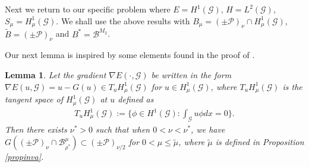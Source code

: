 \documentclass[10pt,a4paper]{article}
\newtheorem{lemma}[theorem]{Lemma}
\newtheorem{remark}[theorem]{Remark}
\theoremstyle{definition} \theoremstyle{remark}
\numberwithin{equation}{section}
\newcommand{\G}{\mathcal{G}}
\newcommand{\B}{\mathcal{B}}
\newcommand{\p}{\mathcal{P}}
\begin{document}

 Next we return to our specific problem where $E = H^1(\G)$, $H = L^2(\G)$, $S_\mu = H^1_\mu(\G)$. We shall use the above results with $B_\mu = (\pm\p)_\nu \cap H^1_\mu(\G)$, $\tilde B = (\pm\p)_\nu$ and $B^* = \B^{M_2}$.

Our next lemma is inspired by some elements found in the proof of \cite[Lemma 2.14]{TaTe}.

\begin{lemma} \label{lemG(u)}
 Let the gradient $\nabla E(\cdot,\G)$ be written in the form $\nabla E(u,\G) = u - G(u) \in T_uH^1_\mu(\G)$ for $u \in H^1_\mu(\G)$, where $T_uH^1_\mu(\G)$ is the tangent space of $H^1_\mu(\G)$ at $u$ defined as
	\begin{align*}
		T_uH^1_\mu(\G) := \bigl\{\phi \in H^1(\G): \int_\G u\phi dx = 0\bigr\}.
	\end{align*}
Then there exists $\nu^* > 0$ such that when $0 < \nu < \nu^*$, we have $G((\pm\p)_\nu \cap \B_{\rho^*}^\mu) \subset (\pm\p)_{\nu/2}$ for $0 < \mu \leq \tilde{\mu}$, where $\tilde{\mu}$ is defined in Proposition \ref{propinva}.
\end{lemma}
\end{document}
